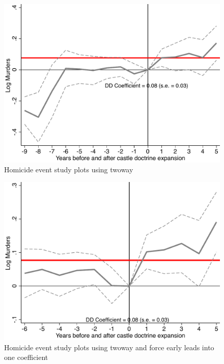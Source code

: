 \documentclass[notes=show]{beamer}
\begin{document}
\begin{frame}[plain]

	\begin{figure}
	\includegraphics[scale=0.5]{./lecture_includes/event_cheng2.pdf}
	\caption{Homicide event study plots using twoway}
	\end{figure}

\end{frame}


\begin{frame}[plain]

	\begin{figure}
	\includegraphics[scale=0.5]{./lecture_includes/event_cheng3.pdf}
	\caption{Homicide event study plots using twoway and force early leads into one coefficient}
	\end{figure}

\end{frame}
\end{document}
